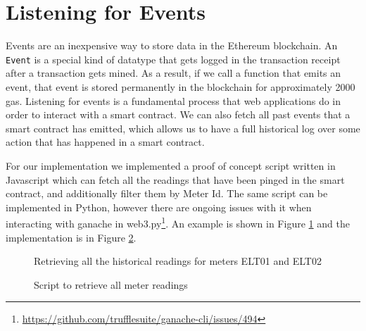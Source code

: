 \section{Listening for Events} \label{apx:implementation:events}

Events are an inexpensive way to store data in the Ethereum blockchain. An \texttt{Event} is a special kind of datatype that gets logged in the transaction receipt after a transaction gets mined. As a result, if we call a function that emits an event, that event is stored permanently in the blockchain for approximately 2000 gas. Listening for events is a fundamental process that web applications do in order to interact with a smart contract. We can also fetch all past events that a smart contract has emitted, which allows us to have a full historical log over some action that has happened in a smart contract. 

For our implementation we implemented a proof of concept script written in Javascript which can fetch all the readings that have been pinged in the smart contract, and additionally filter them by Meter Id. The same script can be implemented in Python, however there are ongoing issues with it when interacting with ganache in web3.py\footnote{\url{https://github.com/trufflesuite/ganache-cli/issues/494}}. An example is shown in Figure \ref{fig:meters-example} and the implementation is in Figure \ref{fig:get-meter-readings}.

\begin{figure}[htb]
    \centering
    
    \caption{Retrieving all the historical readings for meters ELT01 and ELT02}
    \label{fig:meters-example}
\end{figure}

\begin{figure}[htb]
    \centering
     
    \caption{Script to retrieve all meter readings}
    \label{fig:get-meter-readings}
\end{figure}

